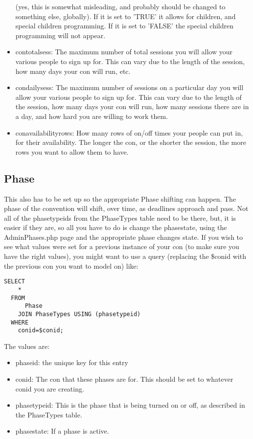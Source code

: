 \documentclass[captions=tablesignature]{scrartcl}
\begin{document}
\begin{itemize}
(yes, this is somewhat misleading, and probably should be changed
to something else, globally).  If it is set to 'TRUE' it allows
for children, and special children programming.  If it is set to
'FALSE' the special children programming will not appear.
\item contotalsess: The maximum number of total sessions you will allow
your various people to sign up for.  This can vary due to the
length of the session, how many days your con will run, etc.
\item condailysess: The maximum number of sessions on a particular day
you will allow your various people to sign up for.  This can vary
due to the length of the session, how many days your con will
run, how many sessions there are in a day, and how hard you are
willing to work them.
\item conavailabilityrows: How many rows of on/off times your people
can put in, for their availability.  The longer the con, or the
shorter the session, the more rows you want to allow them to
have.
\end{itemize}

\subsection{Phase}
\label{sec-11-2}
This also has to be set up so the appropriate Phase shifting can
happen.  The phase of the convention will shift, over time, as
deadlines approach and pass.  Not all of the phasetypeids from the
PhaseTypes table need to be there, but, it is easier if they are,
so all you have to do is change the phasestate, using the
AdminPhases.php page and the appropriate phase changes state.  If
you wish to see what values were set for a previous instance of
your con (to make sure you have the right values), you might want
to use a query (replacing the \$conid with the previous con you want
to model on) like:
\begin{verbatim}
SELECT
    *
  FROM
      Phase
    JOIN PhaseTypes USING (phasetypeid)
  WHERE
    conid=$conid;
\end{verbatim}
The values are:
\begin{itemize}
\item phaseid: the unique key for this entry
\item conid: The con that these phases are for.  This should be set to
whatever conid you are creating.
\item phasetypeid: This is the phase that is being turned on or off, as
described in the PhaseTypes table.
\item phasestate: If a phase is active.
\end{itemize}
\end{document}
